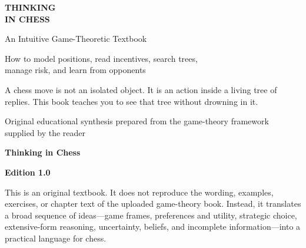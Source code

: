 \begin{titlepage}
\thispagestyle{empty}

\vspace*{1.0in}
{\sffamily\bfseries\fontsize{42}{45}\selectfont\color{white} THINKING\\[0.05em] IN CHESS\par}
\vspace{0.35in}
{\sffamily\fontsize{18}{23}\selectfont\color{PaleGold}An Intuitive Game-Theoretic Textbook\par}
\vspace{0.25in}
{\sffamily\large\color{white}How to model positions, read incentives, search trees,\\manage risk, and learn from opponents\par}
\vfill
\begin{tcolorbox}[width=.76\textwidth,colback=white!7!Navy,colframe=white!25!Navy,boxrule=.6pt,arc=1mm,left=4mm,right=4mm,top=3mm,bottom=3mm]
{\color{white}\small\sffamily
A chess move is not an isolated object. It is an action inside a living tree of replies. This book teaches you to see that tree without drowning in it.}
\end{tcolorbox}
\vspace{0.55in}
{\sffamily\color{white!75}\small Original educational synthesis prepared from the game-theory framework supplied by the reader\par}
\end{titlepage}

\cleardoublepage
\thispagestyle{empty}
\vspace*{1.0in}
{\Large\sffamily\bfseries\color{Navy}Thinking in Chess\par}
\vspace{0.35in}
\textbf{Edition 1.0}

This is an original textbook. It does not reproduce the wording, examples, exercises, or chapter text of the uploaded game-theory book. Instead, it translates a broad sequence of ideas---game frames, preferences and utility, strategic choice, extensive-form reasoning, uncertainty, beliefs, and incomplete information---into a practical language for chess.

